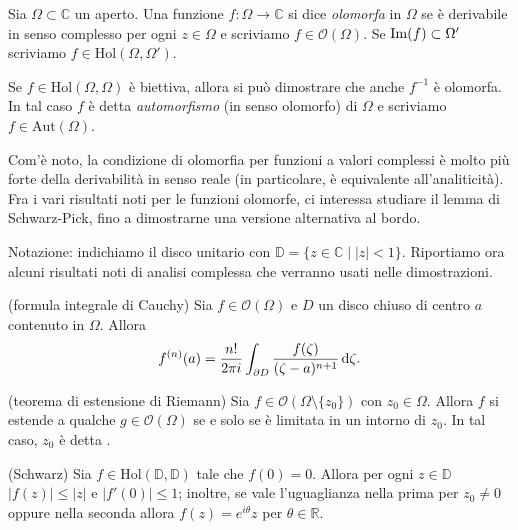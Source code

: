 \begin{defn}
  Sia $\Omega \subset \mathbb{C}$ un aperto. Una funzione $f:\Omega \longrightarrow \mathbb{C}$ si dice \textit{olomorfa} in $\Omega$ se è derivabile in senso complesso per ogni $z \in \Omega$ e scriviamo $f \in \mathcal{O}(\Omega)$. Se $\operatorname{Im}(f) \subset \Omega'$ scriviamo $f \in \text{Hol}(\Omega, \Omega')$.
\end{defn}

\begin{defn}
  Se $f \in \text{Hol}(\Omega, \Omega)$ è biettiva, allora si può dimostrare che anche $f^{-1}$ è olomorfa. In tal caso $f$ è detta \textit{automorfismo} (in senso olomorfo) di $\Omega$ e scriviamo $f \in \text{Aut}(\Omega)$.
\end{defn}

Com'è noto, la condizione di olomorfia per funzioni a valori complessi è molto più forte della derivabilità in senso reale (in particolare, è equivalente all'analiticità). Fra i vari risultati noti per le funzioni olomorfe, ci interessa studiare il lemma di Schwarz-Pick, fino a dimostrarne una versione alternativa al bordo.

Notazione: indichiamo il disco unitario con $\mathbb{D}=\{z \in \mathbb{C} \mid |z|<1\}$. Riportiamo ora alcuni risultati noti di analisi complessa che verranno usati nelle dimostrazioni.

\begin{thm}
  (formula integrale di Cauchy) Sia $f \in \mathcal{O}(\Omega)$ e $D$ un disco chiuso di centro $a$ contenuto in $\Omega$. Allora
  \begin{equation}
    f^{(n)}(a)=\frac{n!}{2\pi i} \int_{\partial D} \frac{f(\zeta)}{(\zeta-a)^{n+1}}\mathop{}\!\mathrm{d}\zeta.
  \end{equation}
\end{thm}

\begin{prop} \label{estensione}
  (teorema di estensione di Riemann) Sia $f \in \mathcal{O}(\Omega \setminus\{z_0\})$ con $z_0 \in \Omega$. Allora $f$ si estende a qualche $g \in \mathcal{O}(\Omega)$ se e solo se è limitata in un intorno di $z_0$. In tal caso, $z_0$ è detta .
\end{prop}

\begin{lm}
  (Schwarz) Sia $f \in \text{Hol}(\mathbb{D},\mathbb{D})$ tale che $f(0)=0$. Allora per ogni $z \in \mathbb{D}$ $|f(z)| \le |z|$ e $|f'(0)| \le 1$; inoltre, se vale l'uguaglianza nella prima per $z_0 \not=0$ oppure nella seconda allora $f(z)=e^{i\theta}z$ per $\theta \in \mathbb{R}$.
\end{lm}


